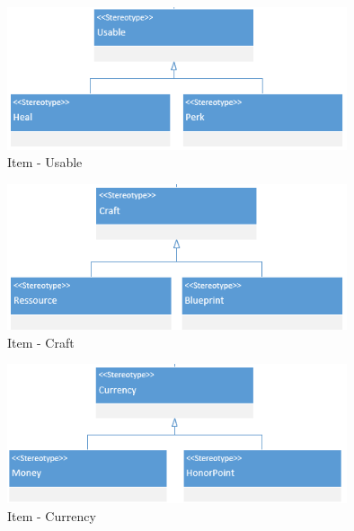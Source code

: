 \begin{figure}[H]
    \begin{center}
    \includegraphics[width=10cm]{10_img/Z_annexeA/item_usable.PNG} 
    \caption{Item - Usable}
    \label{A-Usable}
    \end{center}
\end{figure}

\begin{figure}[H]
    \begin{center}
    \includegraphics[width=10cm]{10_img/Z_annexeA/item_craft.PNG} 
    \caption{Item - Craft}
    \label{A-Craft}
    \end{center}
\end{figure}

\begin{figure}[H]
    \begin{center}
    \includegraphics[width=10cm]{10_img/Z_annexeA/item_currency.PNG} 
    \caption{Item - Currency}
    \label{A-Currency}
    \end{center}
\end{figure}


